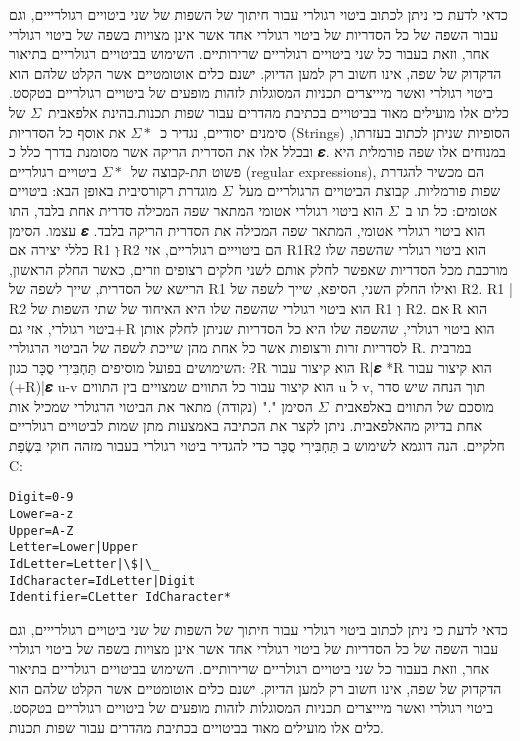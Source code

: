 כדאי לדעת כי ניתן לכתוב ביטוי רגולרי עבור חיתוך של השפות של שני ביטויים
רגולרייים, וגם עבור השפה של כל הסדריות של ביטוי רגולרי אחד אשר אינן מצויות בשפה
של ביטוי רגולרי אחר, וזאת בעבור כל שני ביטויים רגולריים שרירותיים. השימוש
בביטויים רגולריים בתיאור הדקדוק של שפה, אינו חשוב רק למען הדיוק. ישנם כלים
אוטומטיים אשר הקלט שלהם הוא ביטוי רגולרי ואשר מיייצרים תכניות המסוגלות לזהות
מופעים של ביטויים רגולריים בטקסט. כלים אלו מועילים מאוד בביטויים בכתיבת מהדרים
עבור שפות תכנות.בהינת אלפאבית~$Σ$ של סימנים יסודיים, נגדיר כ~$Σ*$ את אוסף כל הסדריות (Strings) הסופיות שניתן לכתוב בעזרתו, ובכלל אלו את הסדרית הריקה אשר מסומנת בדרך כלל כ 𝜺. במנוחים אלו שפה פורמלית היא פשוט תת-קבוצה של~$Σ*$ ביטויים רגולריים (regular expressions), הם מכשיר להגדרת שפות פורמליות.
קבוצת הביטויים הרגולריים מעל~$Σ$ מוגדרת רקורסיבית באופן הבא:
ביטויים אטומים:
כל תו ב~$Σ$ הוא ביטוי רגולרי אטומי המתאר שפה המכילה סדרית אחת בלבד, התו עצמו.
הסימן 𝜺 הוא ביטוי רגולרי אטומי, המתאר שפה המכילה את הסדרית הריקה בלבד.
כללי יצירה
אם R1 וְ ּR2 הם ביטוייים רגולריים, אזי
R1R2 הוא ביטוי רגולרי שהשפה שלו מורכבת מכל הסדריות שאפשר לחלק אותם לשני חלקים רצופים וזרים, כאשר החלק הראשון, הרישא של הסדרית, שייך לשפה של R1 ואילו החלק השני, הסיפא, שייך לשפה של R2.
R1 | R2 הוא ביטוי רגולרי שהשפה שלו היא האיחוד של שתי השפות של R1 וְ R2.
אם ּR הוא ביטוי רגולרי, אזי גם+R הוא ביטוי רגולרי, שהשפה שלו היא כל הסדריות שניתן לחלק אותן לסדריות זרות ורצופות אשר כל אחת מהן שייכת לשפה של הביטוי הרגולרי R.
במרבית השימושים בפועל מוסיפים תַּחְבִּירִי סֻכָּר כגון:
?ּR הוא קיצור עבור R|𝜺
*R הוא קיצור עבור (+R)|𝜺
u-v הוא קיצור עבור כל התווים שמצויים בין התווים u ל v, תוך הנחה שיש סדר מוסכם של התווים באלפאבית~$Σ$
הסימן "." (נקודה) מתאר את הביטוי הרגולרי שמכיל אות אחת בדיוק מהאלפאבית.
ניתן לקצר את הכתיבה באמצעות מתן שמות לביטויים רגולריים חלקיים.
הנה דוגמא לשימוש ב תַּחְבִּירִי סֻכָּר כדי להגדיר ביטוי רגולרי בעבור מזהה חוקי בִּשְׂפַת C:

\begin{verbatim}
Digit=0-9
Lower=a-z
Upper=A-Z
Letter=Lower|Upper
IdLetter=Letter|\$|\_
IdCharacter=IdLetter|Digit
Identifier=CLetter IdCharacter*
\end{verbatim}

כדאי לדעת כי ניתן לכתוב ביטוי רגולרי עבור חיתוך של השפות של שני ביטויים
רגולרייים, וגם עבור השפה של כל הסדריות של ביטוי רגולרי אחד אשר אינן מצויות בשפה
של ביטוי רגולרי אחר, וזאת בעבור כל שני ביטויים רגולריים שרירותיים. השימוש
בביטויים רגולריים בתיאור הדקדוק של שפה, אינו חשוב רק למען הדיוק. ישנם כלים
אוטומטיים אשר הקלט שלהם הוא ביטוי רגולרי ואשר מיייצרים תכניות המסוגלות לזהות
מופעים של ביטויים רגולריים בטקסט. כלים אלו מועילים מאוד בביטויים בכתיבת מהדרים
עבור שפות תכנות.

